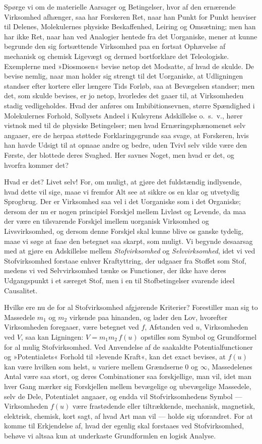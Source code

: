 \documentclass[12pt]{book}
\newcommand{\apage}[1]{\marginnote{\footnotesize\textit{[#1]}}}
\begin{document}
Spørge vi om de materielle Aarsager og Betingelser, hvor af den ernærende
Virksomhed afhænger, saa har Forskeren Ret, naar han Punkt for Punkt
henviser til Delenes, Molekulernes physiske Beskaffenhed, Leiring og
Omsætning; men han har ikke Ret, naar han ved Analogier hentede fra det
Uorganiske, mener at kunne begrunde den sig fortsættende Virksomhed paa en
fortsat Ophævelse af mechanisk og chemisk Ligevægt og dermed bortforklare
det Teleologiske. Exemplerne med »Diosmosen« bevise netop det Modsatte, af
hvad de skulde. De bevise nemlig, naar man holder sig strengt til det
Uorganiske, at Udligningen standser efter kortere eller længere Tids
Forløb, saa at Bevægelsen standser; men det, som skulde bevises, er jo
\apage{177} netop, hvorledes det gaaer til, at Virksomheden stadig vedligeholdes. Hvad
der anføres om Imbibitionsevnen, større Spændighed i Molekulernes Forhold,
Sollysets Andeel i Kulsyrens Adskillelse o.\ s.\ v., hører vistnok med til de
physiske Betingelser; men hvad Ernæringsphænomenet selv angaaer, ere de
herpaa støttede Forklaringsgrunde saa svage, at Forskeren, hvis han havde
Udsigt til at opnaae andre og bedre, uden Tvivl selv vilde være den Første,
der blottede deres Svaghed. Her savnes Noget, men hvad er det, og hvorfra
kommer det?

Hvad er det? Livet selv! For, om muligt, at gjøre det fuldstændig
indlysende, hvad dette vil sige, maae vi fremfor Alt see at sikkre os en
klar og utvetydig Sprogbrug. Der er Virksomhed saa vel i det Uorganiske som
i det Organiske; dersom der nu er nogen principiel Forskjel mellem Livløst
og Levende, da maa der være en tilsvarende Forskjel imellem uorganisk
Virksomhed og Livsvirksomhed, og dersom denne Forskjel skal kunne blive os
ganske tydelig, maae vi søge at faae den betegnet saa skarpt, som muligt.
Vi begynde desaarsag med at gjøre en Adskillelse mellem \emph{Stofvirksomhed} og
\emph{Selvvirksomhed}, idet vi ved Stofvirksomhed forstaae enhver Kraftyttring,
der udgaaer fra Stoffet som Stof, medens vi ved Selvvirksomhed tænke os
Functioner, der ikke have deres Udgangspunkt i et særeget Stof, men i en
til Stofbetingelser svarende ideel Causalitet.

Hvilke ere nu de for al Stofvirksomhed afgjørende Kriterier? Forestiller
man sig to Massedele $m_1$ og $m_2$ \apage{178} virkende paa hinanden, og lader den
Lov, hvorefter Virksomheden foregaaer, være betegnet ved $f$, Afstanden ved
$u$, Virksomheden ved $V$, saa kan Ligningen: $V = m_1 m_2\, f(u)$ opstilles
som Symbol og Grundformel for al mulig Stofvirksomhed. Ved Anvendelse af de
saakaldte Potentialfunctioner og »Potentialets« Forhold til »levende
Kraft«, kan det exact bevises, at $f(u)$ kan være hvilken som helst, $u$
variere mellem Grændserne $0$ og $\infty$, Massedelenes Antal være saa
stort, og deres Combinationer saa forskjellige, man vil, idet man hver Gang
mærker sig Forskjellen mellem bevægelige og ubevægelige Massedele, selv de
Dele, Potentialet angaaer, og endda vil Stofvirksomhedens Symbol ---
Virksomheden $f(u)$ være frastødende eller tiltrækkende, mechanisk,
magnetisk, elektrisk, chemisk, kort sagt, af hvad Art man vil --- holde sig
uforandret. For at komme til Erkjendelse af, hvad der egenlig skal forstaaes
ved Stofvirksomhed, behøve vi altsaa kun at underkaste Grundformlen en
logisk Analyse.
\end{document}
